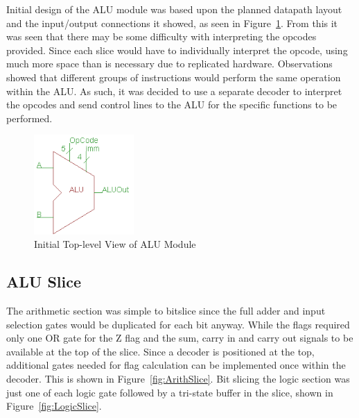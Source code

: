 Initial design of the ALU module was based upon the planned datapath layout and the input/output connections it showed, as seen in Figure~\ref{fig:BasicALUSym}. 
From this it was seen that there may be some difficulty with interpreting the opcodes provided. 
Since each slice would have to individually interpret the opcode, using much more space than is necessary due to replicated hardware. 
Observations showed that different groups of instructions would perform the same operation within the ALU. 
As such, it was decided to use a separate decoder to interpret the opcodes and send control lines to the ALU for the specific functions to be performed. 

\begin{figure}[h]
	\centering
	\includegraphics[width=1.5in]{Figures/ALUTopLevel.png}
	\caption{Initial Top-level View of ALU Module}
	\label{fig:BasicALUSym}
\end{figure}

\subsection{ALU Slice}
The arithmetic section was simple to bitslice since the full adder and input selection gates would be duplicated for each bit anyway. 
While the flags required only one OR gate for the Z flag and the sum, carry in and carry out signals to be available at the top of the slice. 
Since a decoder is positioned at the top, additional gates needed for flag calculation can be implemented once within the decoder. 
This is shown in Figure~\ref{fig:ArithSlice}. 
Bit slicing the logic section was just one of each logic gate followed by a tri-state buffer in the slice, shown in Figure~\ref{fig:LogicSlice}. 


